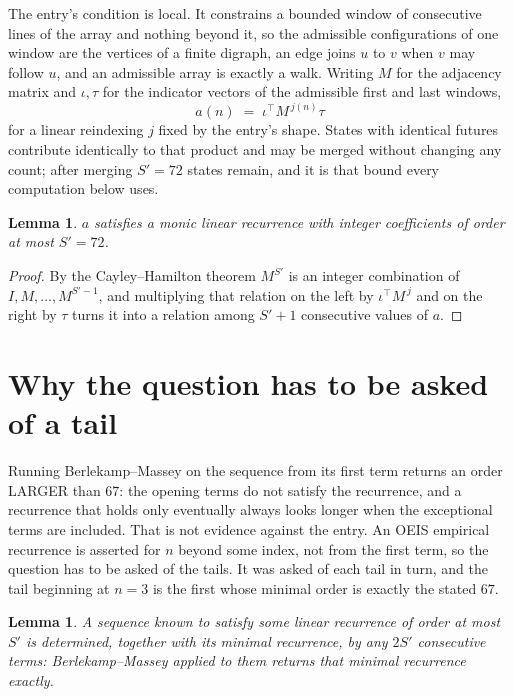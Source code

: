 \documentclass[11pt,a4paper]{article}
\theoremstyle{plain}
\newtheorem{lemma}[theorem]{Lemma}
\theoremstyle{definition}
\begin{document}
The entry's condition is local. It constrains a bounded window of consecutive lines of the
array and nothing beyond it, so the admissible configurations of one window are the vertices of
a finite digraph, an edge joins $u$ to $v$ when $v$ may follow $u$, and an admissible array is
exactly a walk. Writing $M$ for the adjacency matrix and $\iota,\tau$ for the indicator vectors
of the admissible first and last windows,
\[
a(n)\;=\;\iota^{\!\top}M^{\,j(n)}\tau
\]
for a linear reindexing $j$ fixed by the entry's shape. States with identical futures
contribute identically to that product and may be merged without changing any count; after
merging $S'=72$ states remain, and it is that bound every computation below uses.

\begin{lemma}\label{lem:cf}
$a$ satisfies a monic linear recurrence with integer coefficients of order at most $S'=72$.
\end{lemma}

\begin{proof}
By the Cayley--Hamilton theorem $M^{S'}$ is an integer combination of $I,M,\dots,M^{S'-1}$,
and multiplying that relation on the left by $\iota^{\!\top}M^{\,j}$ and on the right by
$\tau$ turns it into a relation among $S'+1$ consecutive values of $a$.
\end{proof}

\section{Why the question has to be asked of a tail}

Running Berlekamp--Massey on the sequence from its first term returns an order LARGER than $67$: the opening terms do not satisfy the recurrence, and a recurrence that holds only eventually always looks longer when the exceptional terms are included. That is not evidence against the entry. An OEIS empirical recurrence is asserted for $n$ beyond some index, not from the first term, so the question has to be asked of the tails. It was asked of each tail in turn, and the tail beginning at $n=3$ is the first whose minimal order is exactly the stated $67$.

\begin{lemma}\label{lem:bm}
A sequence known to satisfy some linear recurrence of order at most $S'$ is determined,
together with its minimal recurrence, by any $2S'$ consecutive terms: Berlekamp--Massey applied
to them returns that minimal recurrence exactly.
\end{lemma}
\end{document}
